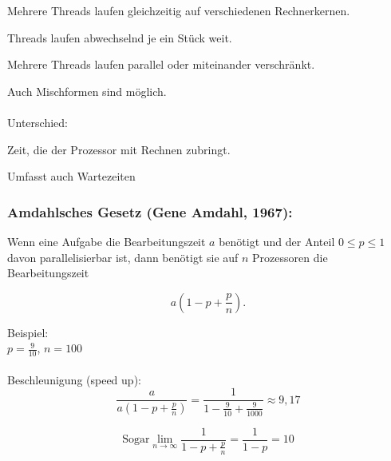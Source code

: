 \begin{definition}[parallel]
Mehrere Threads laufen gleichzeitig auf verschiedenen Rechnerkernen.
\end{definition}

\begin{definition}
Threads laufen abwechselnd je ein Stück weit.
\end{definition}

\begin{definition}
Mehrere Threads laufen parallel oder miteinander verschränkt.
\end{definition}

Auch Mischformen sind möglich.\\
\\
Unterschied:\\
\begin{definition}
Zeit, die der Prozessor mit Rechnen zubringt.
\end{definition}

\begin{definition}
Umfasst auch Wartezeiten
\end{definition}

\subsubsection*{Amdahlsches Gesetz (Gene Amdahl, 1967):}
Wenn eine Aufgabe die Bearbeitungszeit $ a $ benötigt und der Anteil $ 0 \leq p \leq 1 $ davon parallelisierbar ist, dann benötigt sie auf $ n $ Prozessoren die Bearbeitungszeit

\begin{equation}
a \left( 1 - p + \frac{p}{n} \right).
\end{equation}

Beispiel:\\
$ p = \frac{9}{10} $, $ n = 100 $\\
\\
Beschleunigung (speed up): 
\begin{equation*}
 \frac{a}{a \left( 1 - p + \frac{p}{n} \right)} = \frac{1}{1 - \frac{9}{10} + \frac{9}{1000}} \approx 9,17
\end{equation*}

\begin{equation*}
\text{Sogar} \lim\limits_{n \to \infty} \frac{1}{1 - p + \frac{p}{n}} = \frac{1}{1 - p} = 10
\end{equation*}

